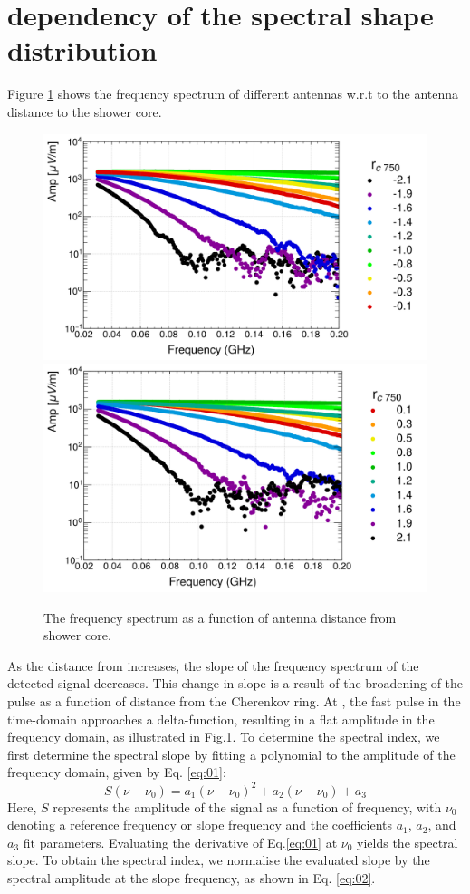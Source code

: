 \section{\xmax dependency of the spectral shape distribution}
\label{sec:slope}
Figure \ref{fig:spectra} shows the frequency spectrum of different antennas w.r.t to the antenna distance to the shower core. 
\begin{figure}[ht]
    \centering
    \includegraphics[width=.5\linewidth]{spectra2}\hfill
    \includegraphics[width=.5\linewidth]{spectra}
    \caption{The frequency spectrum as a function of antenna distance from shower core.}
    \label{fig:spectra}
\end{figure}
As the distance from \rc increases, the slope of the frequency spectrum of the detected signal decreases. This change in slope is a result of the broadening of the pulse as a function of distance from the Cherenkov ring. At \rc, the fast pulse in the time-domain approaches a delta-function, resulting in a flat amplitude in the frequency domain, as illustrated in Fig.\ref{fig:spectra}. To determine the spectral index, we first determine the spectral slope by fitting a polynomial to the amplitude of the frequency domain, given by Eq. \ref{eq:01}:
\begin{equation}\label{eq:01}
S(\nu-\nu_0)= a_1(\nu-\nu_0)^2+ a_2(\nu-\nu_0)+a_3
\end{equation}
Here, $S$ represents the amplitude of the signal as a function of frequency, with $\nu_0$ denoting a reference frequency or slope frequency and the coefficients $a_1$, $a_2$, and $a_3$ fit parameters. Evaluating the derivative of Eq.\ref{eq:01} at $\nu_0$ yields the spectral slope. To obtain the spectral index, we normalise the evaluated slope by the spectral amplitude at the slope frequency, as shown in Eq. \ref{eq:02}.
